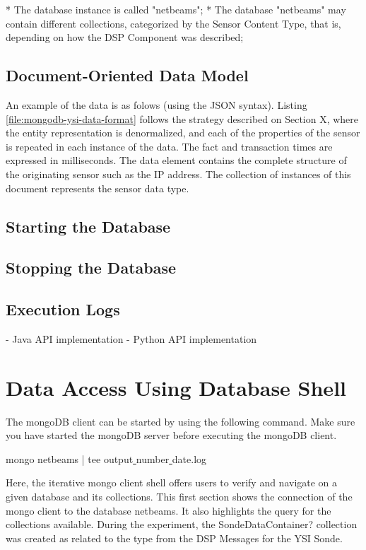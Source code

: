     * The database instance is called "netbeams";
    * The database "netbeams" may contain different collections, categorized by
    the Sensor Content Type, that is, depending on how the DSP Component was
    described;  

\subsection{Document-Oriented Data Model}

An example of the data is as folows (using the JSON syntax). Listing
\ref{file:mongodb-ysi-data-format} follows the strategy described on Section X,
where the entity representation is denormalized, and each of the properties of
the sensor is repeated in each instance of the data. The fact and transaction
times are expressed in milliseconds. The data element contains the complete
structure of the originating sensor such as the IP address. The collection of
instances of this document represents the sensor data type.

\subsection{Starting the Database}

\subsection{Stopping the Database}

\subsection{Execution Logs}

- Java API implementation
- Python API implementation

\section{Data Access Using Database Shell}

The mongoDB client can be started by using the following command. Make sure you
have started the mongoDB server before executing the mongoDB client.

mongo netbeams | tee output\underline{ }number\underline{ }date.log

Here, the iterative mongo client shell offers users to verify and navigate on a
given database and its collections. This first section shows the connection of
the mongo client to the database netbeams. It also highlights the query for the
collections available. During the experiment, the SondeDataContainer?
collection was created as related to the type from the DSP Messages for the YSI
Sonde.


